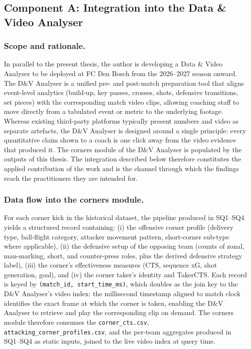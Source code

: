 \subsection{Component A: Integration into the Data \& Video Analyser}
\label{sec:sq5_dv_analyser}

\subsubsection{Scope and rationale.}
In parallel to the present thesis, the author is developing a Data \& Video
Analyser to be deployed at FC Den Bosch from the 2026–2027 season onward.
The D\&V Analyser is a unified pre- and post-match preparation tool that
aligns event-level analytics (build-up, key passes, crosses, shots,
defensive transitions, set pieces) with the corresponding match video
clips, allowing coaching staff to move directly from a tabulated event or
metric to the underlying footage. Whereas existing third-party platforms
typically present numbers and video as separate artefacts, the D\&V
Analyser is designed around a single principle: every quantitative claim
shown to a coach is one click away from the video evidence that produced
it.
The corners module of the D\&V Analyser is populated by the outputs of
this thesis. The integration described below therefore constitutes the
applied contribution of the work and is the channel through which the
findings reach the practitioners they are intended for.

\subsubsection{Data flow into the corners module.}
For each corner kick in the historical dataset, the pipeline produced in
SQ1–SQ4 yields a structured record containing: (i) the offensive corner
profile (delivery type, ball-flight category, attacker movement pattern,
short-corner sub-type where applicable), (ii) the defensive setup of the
opposing team (counts of zonal, man-marking, short, and counter-press
roles, plus the derived defensive strategy label), (iii) the corner's
effectiveness measures (CTS, sequence xG, shot generation, goal), and
(iv) the corner taker's identity and TakerCTS. Each record is keyed by
\texttt{(match\_id, start\_time\_ms)}, which doubles as the join key to
the D\&V Analyser's video index: the millisecond timestamp aligned to
match clock identifies the exact frame at which the corner is taken,
enabling the D\&V Analyser to retrieve and play the corresponding clip on
demand. The corners module therefore consumes the
\texttt{corner\_cts.csv}, \texttt{attacking\_corner\_profiles.csv}, and
the per-team aggregates produced in SQ1–SQ4 as static inputs, joined to
the live video index at query time.

